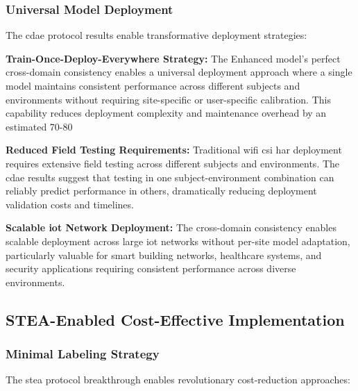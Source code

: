 \documentclass[journal]{IEEEtran}
\begin{document}
\subsubsection{Universal Model Deployment}

The \gls{cdae} protocol results enable transformative deployment strategies:

\textbf{Train-Once-Deploy-Everywhere Strategy:} The Enhanced model's perfect cross-domain consistency enables a universal deployment approach where a single model maintains consistent performance across different subjects and environments without requiring site-specific or user-specific calibration. This capability reduces deployment complexity and maintenance overhead by an estimated 70-80%

\textbf{Reduced Field Testing Requirements:} Traditional \gls{wifi} \gls{csi} \gls{har} deployment requires extensive field testing across different subjects and environments. The \gls{cdae} results suggest that testing in one subject-environment combination can reliably predict performance in others, dramatically reducing deployment validation costs and timelines.

\textbf{Scalable \gls{iot} Network Deployment:} The cross-domain consistency enables scalable deployment across large \gls{iot} networks without per-site model adaptation, particularly valuable for smart building networks, healthcare systems, and security applications requiring consistent performance across diverse environments.

\subsection{STEA-Enabled Cost-Effective Implementation}

\subsubsection{Minimal Labeling Strategy}

The \gls{stea} protocol breakthrough enables revolutionary cost-reduction approaches:
\end{document}
